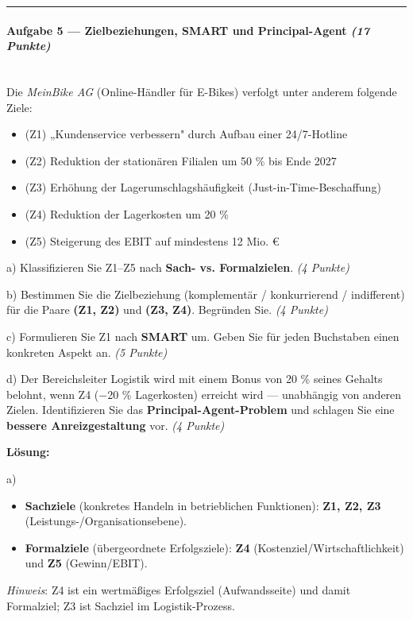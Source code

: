 \documentclass[11pt, a4paper]{article}
\begin{document}
\noindent\textcolor{rulegray}{\rule{\linewidth}{0.4pt}}


\paragraph{Aufgabe 5 — Zielbeziehungen, SMART und Principal-Agent \textit{(17 Punkte)}}\mbox{}\\[2pt]

Die \textit{MeinBike AG} (Online-Händler für E-Bikes) verfolgt unter anderem folgende Ziele:


\begin{itemize}
  \item (Z1) „Kundenservice verbessern" durch Aufbau einer 24/7-Hotline
  \item (Z2) Reduktion der stationären Filialen um 50 \% bis Ende 2027
  \item (Z3) Erhöhung der Lagerumschlagshäufigkeit (Just-in-Time-Beschaffung)
  \item (Z4) Reduktion der Lagerkosten um 20 \%
  \item (Z5) Steigerung des EBIT auf mindestens 12 Mio. €
\end{itemize}

a) Klassifizieren Sie Z1–Z5 nach \textbf{Sach- vs. Formalzielen}. \textit{(4 Punkte)}


b) Bestimmen Sie die Zielbeziehung (komplementär / konkurrierend / indifferent) für die Paare \textbf{(Z1, Z2)} und \textbf{(Z3, Z4)}. Begründen Sie. \textit{(4 Punkte)}


c) Formulieren Sie Z1 nach \textbf{SMART} um. Geben Sie für jeden Buchstaben einen konkreten Aspekt an. \textit{(5 Punkte)}


d) Der Bereichsleiter Logistik wird mit einem Bonus von 20 \% seines Gehalts belohnt, wenn Z4 (−20 \% Lagerkosten) erreicht wird — unabhängig von anderen Zielen. Identifizieren Sie das \textbf{Principal-Agent-Problem} und schlagen Sie eine \textbf{bessere Anreizgestaltung} vor. \textit{(4 Punkte)}


\textbf{Lösung:}


a)

\begin{itemize}
  \item \textbf{Sachziele} (konkretes Handeln in betrieblichen Funktionen): \textbf{Z1, Z2, Z3} (Leistungs-/Organisationsebene).
  \item \textbf{Formalziele} (übergeordnete Erfolgsziele): \textbf{Z4} (Kostenziel/Wirtschaftlichkeit) und \textbf{Z5} (Gewinn/EBIT).
\end{itemize}
\textit{Hinweis}: Z4 ist ein wertmäßiges Erfolgsziel (Aufwandsseite) und damit Formalziel; Z3 ist Sachziel im Logistik-Prozess.
\end{document}
